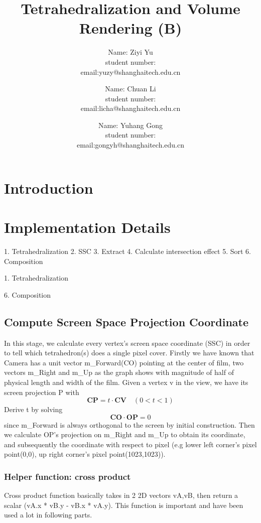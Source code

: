 \documentclass[acmtog]{acmart}
\title{Tetrahedralization and Volume Rendering (B)}
\author{Name: Ziyi Yu   \\ student number:\quad 2018533124
	\\email:\quad yuzy@shanghaitech.edu.cn}
\author{Name: Chuan Li   \\ student number:\quad 123456789
	\\email:\quad licha@shanghaitech.edu.cn}
\author{Name: Yuhang Gong  \\ student number:\quad 2018533180
	\\email:\quad gongyh@shanghaitech.edu.cn}
\begin{document}
\maketitle

\vspace*{2 ex}


\section{Introduction}


\section{Implementation Details}
1. Tetrahedralization
2. SSC
3. Extract
4. Calculate intersection effect
5. Sort
6. Composition

1. Tetrahedralization



6. Composition
\subsection{Compute Screen Space Projection Coordinate}
In this stage, we calculate every vertex’s screen space coordinate (SSC) in order to tell which tetrahedron(s) does a single pixel cover. Firstly we have known that Camera has a unit vector m\_Forward(CO) pointing at the center of film, two vectors m\_Right and m\_Up as the graph shows with magnitude of half of physical length and width of the film. Given a vertex v in the view, we have its screen projection P with 
\begin{equation} 
\boldsymbol {CP} = t \cdot
\boldsymbol{CV}
\quad (0<t<1)
\end{equation} 
Derive t by solving 
\begin{equation} 
\boldsymbol {CO}\cdot \boldsymbol{OP}=0
\end{equation} since m\_Forward is always orthogonal to the screen by initial construction. Then we calculate OP’s projection on m\_Right and m\_Up to obtain its coordinate, and subsequently the coordinate with respect to pixel (e.g lower left corner’s pixel point(0,0), up right corner’s pixel point(1023,1023)). 
\\
\subsubsection{Helper function: cross product}
Cross product function basically takes in 2 2D vectors vA,vB, then return a scalar (vA.x * vB.y - vB.x * vA.y). This function is important and have been used a lot in following parts. 
\\
\end{document}
